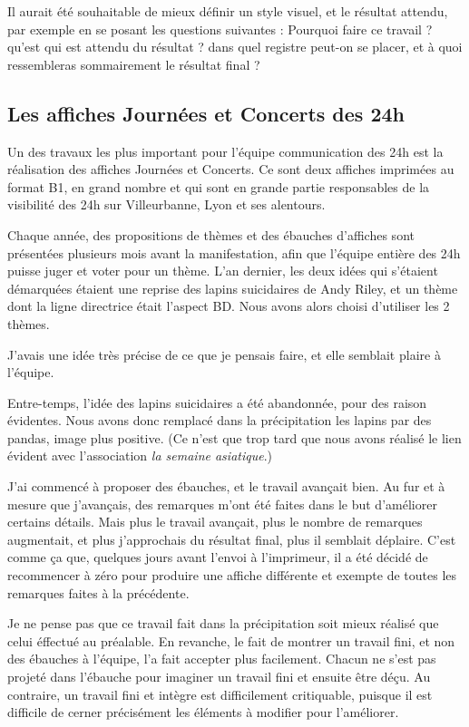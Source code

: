         Il aurait été souhaitable de mieux définir un style visuel, et le résultat attendu, par exemple en se posant les questions suivantes :
        Pourquoi faire ce travail ? qu'est qui est attendu du résultat ? dans quel registre peut-on se placer, et à quoi ressembleras sommairement le résultat final ?
        
    \subsection{Les affiches Journées et Concerts des 24h}
        
        Un des travaux les plus important pour l'équipe communication des 24h est la réalisation des affiches Journées et Concerts.
        Ce sont deux affiches imprimées au format B1, en grand nombre et qui sont en grande partie responsables de la visibilité des 24h sur Villeurbanne, Lyon et ses alentours.
        
        Chaque année, des propositions de thèmes et des ébauches d'affiches sont présentées plusieurs mois avant la manifestation, afin que l'équipe entière des 24h puisse juger et voter pour un thème.
        L'an dernier, les deux idées qui s'étaient démarquées étaient une reprise des lapins suicidaires de Andy Riley, et un thème dont la ligne directrice était l'aspect BD.
        Nous avons alors choisi d'utiliser les 2 thèmes.

        J'avais une idée très précise de ce que je pensais faire, et elle semblait plaire à l'équipe.
        
        Entre-temps, l'idée des lapins suicidaires a été abandonnée, pour des raison évidentes.
        Nous avons donc remplacé dans la précipitation les lapins par des pandas, image plus positive. (Ce n'est que trop tard que nous avons réalisé le lien évident avec l'association \emph{la semaine asiatique}.)
        
        J'ai commencé à proposer des ébauches, et le travail avançait bien.
        Au fur et à mesure que j'avançais, des remarques m'ont été faites dans le but d'améliorer certains détails.
        Mais plus le travail avançait, plus le nombre de remarques augmentait, et plus j'approchais du résultat final, plus il semblait déplaire.
        C'est comme ça que, quelques jours avant l'envoi à l'imprimeur, il a été décidé de recommencer à zéro pour produire une affiche différente et exempte de toutes les remarques faites à la précédente.
        
        Je ne pense pas que ce travail fait dans la précipitation soit mieux réalisé que celui éffectué au préalable.
        En revanche, le fait de montrer un travail fini, et non des ébauches à l'équipe, l'a fait accepter plus facilement.
        Chacun ne s'est pas projeté dans l'ébauche pour imaginer un travail fini et ensuite être déçu.
        Au contraire, un travail fini et intègre est difficilement critiquable, puisque il est difficile de cerner précisément les éléments à modifier pour l'améliorer.
        
